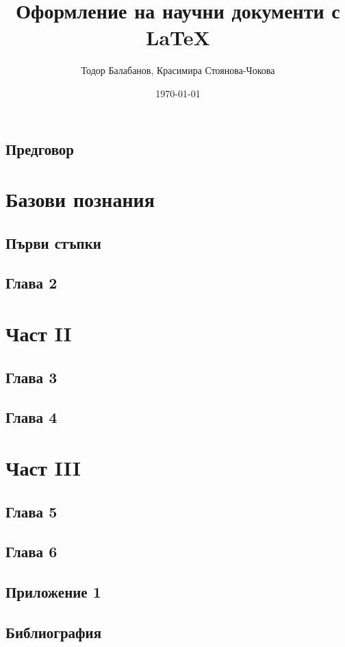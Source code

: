 \documentclass{book}
\title{Оформление на научни документи с LaTeX}
\author{Тодор Балабанов, Красимира Стоянова-Чокова}
\date{\today}
\begin{document}
\maketitle

\frontmatter

\tableofcontents

\listoffigures

\listoftables

\mainmatter

\chapter*{Предговор}


\part{Базови познания}

\chapter{Първи стъпки}


\chapter{Глава 2}

\part{Част II}

\chapter{Глава 3}

\chapter{Глава 4}

\part{Част III}

\chapter{Глава 5}

\chapter{Глава 6}

\appendix

\chapter{Приложение 1}

\backmatter

\chapter{Библиография}

\end{document}
